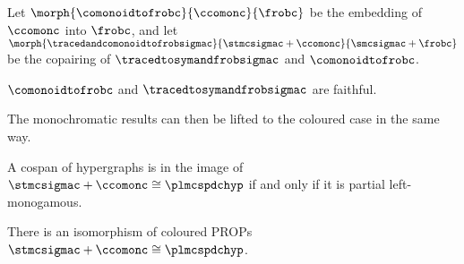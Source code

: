 \begin{definition}
    Let \(
    \morph{
        \comonoidtofrobc
    }{
        \ccomonc
    }{
        \frobc
    }
    \) be the embedding of \(\ccomonc\) into \(\frobc\), and let \(
    \morph{
        \tracedandcomonoidtofrobsigmac
    }{
        \stmcsigmac + \ccomonc
    }{
        \smcsigmac + \frobc
    }
    \) be the copairing of \(\tracedtosymandfrobsigmac\) and
    \(\comonoidtofrobc\).
\end{definition}

\begin{corollary}
    \(\comonoidtofrobc\) and \(\tracedtosymandfrobsigmac\) are faithful.
\end{corollary}

The monochromatic results can then be lifted to the coloured case in the same
way.

\begin{theorem}\label{thm:comonoidc-fully-complete}
    A cospan of hypergraphs is in the image of
    \(\stmcsigmac + \ccomonc \cong \plmcspdchyp\) if and only if it is partial
    left-monogamous.
\end{theorem}

\begin{corollary}
    There is an isomorphism of coloured PROPs
    \(\stmcsigmac + \ccomonc \cong \plmcspdchyp\).
\end{corollary}